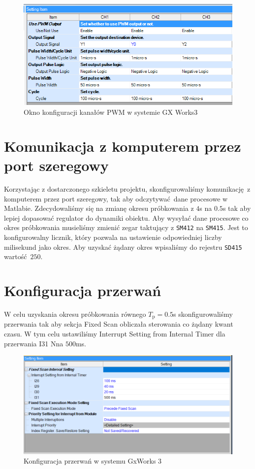 \begin{figure}[h]
    \label{PLC::Konfiguracja::HIOEN::WindowCH5}
    \centering
    \includegraphics[scale=0.58]{./sections/inteco/images/pwm.png}
    \caption{Okno konfiguracji kanałów PWM w systemie GX Works3}
\end{figure}


\section{Komunikacja z komputerem przez port szeregowy}
\label{inteco_matlab}
Korzystając z dostarczonego szkieletu projektu, skonfigurowaliśmy komunikację z komputerem
przez port szeregowy, tak aby odczytywać dane procesowe w Matlabie. Zdecydowaliśmy się 
na zmianę okresu próbkowania z $\num{4}$s na $\num{0.5}$s tak aby lepiej dopasować regulator
do dynamiki obiektu. Aby wysyłać dane procesowe co okres próbkowania musieliśmy zmienić 
zegar taktujący z \texttt{SM412} na \texttt{SM415}. Jest to konfigurowalny licznik, który 
pozwala na ustawienie odpowiedniej liczby milisekund jako okres. Aby uzyskać żądany okres
wpisaliśmy do rejestru \texttt{SD415} wartość $\num{250}$.

\section{Konfiguracja przerwań}
\label{inteco_interrupts}
W celu uzyskania okresu próbkowania równego $T_{\mathrm{p}} = \num{0.5}$s skonfigurowaliśmy
przerwania tak aby sekcja Fixed Scan obliczała sterowania co żądany kwant czasu. W tym celu
ustawiliśmy Interrupt Setting from Internal Timer dla przerwania I31 Nna $\num{500}$ms.


\begin{figure}[h]
    \label{PLC::Konfiguracja::HIOEN::WindowCH5}
    \centering
    \includegraphics[scale=0.36]{./sections/inteco/images/interrupt.png}
    \caption{Konfiguracja przerwań w systemu GxWorks 3}
\end{figure}


